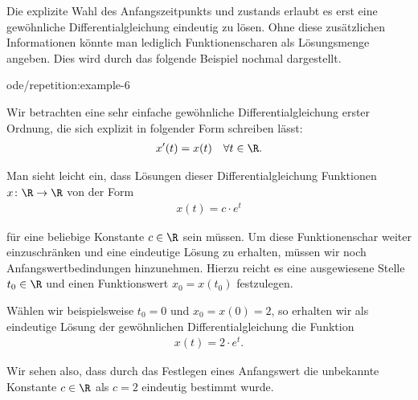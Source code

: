 \documentclass[letterpaper,10pt,english]{jupyterBook}
\begin{document}
\par
Die explizite Wahl des Anfangszeitpunkts und  zustands erlaubt es erst eine gewöhnliche Differentialgleichung eindeutig zu lösen.
Ohne diese zusätzlichen Informationen könnte man lediglich Funktionenscharen als Lösungsmenge angeben.
Dies wird durch das folgende Beispiel nochmal dargestellt.
\begin{example}{}{ode/repetition:example-6}



\par
Wir betrachten eine sehr einfache gewöhnliche Differentialgleichung erster Ordnung, die sich explizit in folgender Form schreiben lässt:
\begin{align*}
x'(t) = x(t) \quad \forall t \in \R.
\end{align*}
\par
Man sieht leicht ein, dass Lösungen dieser Differentialgleichung Funktionen \(x \colon \R \rightarrow \R\) von der Form
\begin{align*}
x(t) = c\cdot e^t
\end{align*}
\par
für eine beliebige Konstante \(c \in \R\) sein müssen.
Um diese Funktionenschar weiter einzuschränken und eine eindeutige Lösung zu erhalten, müssen wir noch Anfangswertbedindungen hinzunehmen.
Hierzu reicht es eine ausgewiesene Stelle \(t_0 \in \R\) und einen Funktionswert \(x_0 = x(t_0)\) festzulegen.

\par
Wählen wir beispielsweise \(t_0 = 0\) und \(x_0 = x(0) = 2\), so erhalten wir als eindeutige Lösung der gewöhnlichen Differentialgleichung die Funktion
\begin{align*}
x(t) = 2\cdot e^t.
\end{align*}
\par
Wir sehen also, dass durch das Festlegen eines Anfangswert die unbekannte Konstante \(c \in \R\) als \(c=2\) eindeutig bestimmt wurde.
\end{example}
\end{document}
